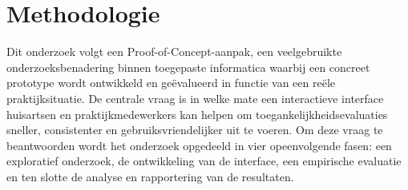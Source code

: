 \section{Methodologie}%
\label{sec:methodologie}







Dit onderzoek volgt een Proof-of-Concept-aanpak, een veelgebruikte onderzoeksbenadering binnen toegepaste informatica waarbij een concreet prototype wordt ontwikkeld en geëvalueerd in functie van een reële praktijksituatie.
De centrale vraag is in welke mate een interactieve interface huisartsen en praktijkmedewerkers kan helpen om toegankelijkheidsevaluaties sneller, consistenter en gebruiksvriendelijker uit te voeren.
Om deze vraag te beantwoorden wordt het onderzoek opgedeeld in vier opeenvolgende fasen: een exploratief onderzoek, de ontwikkeling van de interface, een empirische evaluatie en ten slotte de analyse en rapportering van de resultaten.
